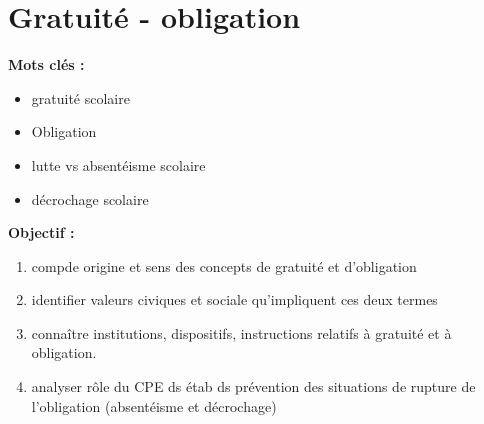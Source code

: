 \documentclass[12pt]{report}
\begin{document}
\chapter{Gratuité - obligation}

\textbf{Mots clés : }
\begin{itemize}
\item gratuité scolaire
\item Obligation
\item lutte vs absentéisme scolaire
\item décrochage scolaire
\end{itemize}

\vspace{0.5cm}

\textbf{Objectif :}


\begin{enumerate}
\item compde origine et sens des concepts de gratuité et d'obligation
\item identifier valeurs civiques et sociale qu'impliquent ces deux termes
\item connaître institutions, dispositifs, instructions relatifs à gratuité et à obligation.
\item analyser rôle du CPE ds étab ds prévention des situations de rupture de l'obligation (absentéisme et décrochage)\\
\end{enumerate}
\end{document}
